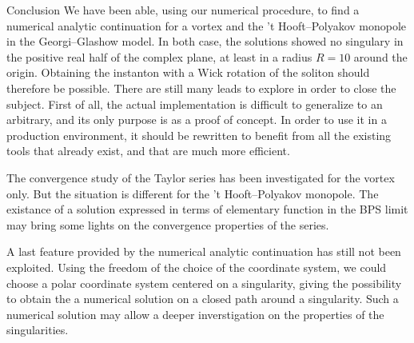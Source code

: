 \begin{section}{Conclusion}
  We have been able, using our numerical procedure, to find a
  numerical analytic continuation for a vortex and the 't
  Hooft--Polyakov monopole in the Georgi--Glashow model. In both case,
  the solutions showed no singulary in the positive real half of the
  complex plane, at least in a radius $R=10$ around the
  origin. Obtaining the instanton with a Wick rotation of the soliton
  should therefore be possible.  There are still many leads to explore
  in order to close the subject. First of all, the actual
  implementation is difficult to generalize to an arbitrary, and its
  only purpose is as a proof of concept. In order to use it in a
  production environment, it should be rewritten to benefit from all
  the existing tools that already exist, and that are much more
  efficient.

  The convergence study of the Taylor series has been investigated
  for the vortex only. But the situation is different for the 't
  Hooft--Polyakov monopole.  The existance of a solution expressed in
  terms of elementary function in the BPS limit may bring some lights
  on the convergence properties of the series.

  A last feature provided by the numerical analytic continuation has
  still not been exploited. Using the freedom of the choice of the
  coordinate system, we could choose a polar coordinate system
  centered on a singularity, giving the possibility to obtain the a
  numerical solution on a closed path around a singularity. Such a
  numerical solution may allow a deeper inverstigation on the
  properties of the singularities.
  

\end{section}
